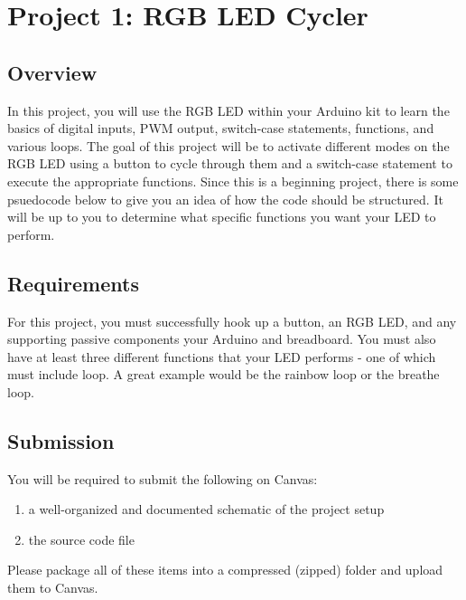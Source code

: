 %

\chapter{Project 1: RGB LED Cycler}

\section*{Overview}
In this project, you will use the RGB LED within your Arduino kit to learn the basics of digital inputs, PWM output, switch-case statements, functions, and various loops.
The goal of this project will be to activate different modes on the RGB LED using a button to cycle through them and a switch-case statement to execute the appropriate functions.
Since this is a beginning project, there is some psuedocode below to give you an idea of how the code should be structured.
It will be up to you to determine what specific functions you want your LED to perform.

\section*{Requirements}
For this project, you must successfully hook up a button, an RGB LED, and any supporting passive components your Arduino and breadboard.
You must also have at least three different functions that your LED performs - one of which must include loop. A great example would be the rainbow loop or the breathe loop.

\section*{Submission}
You will be required to submit the following on Canvas:
\begin{enumerate}
    \item a well-organized and documented schematic of the project setup
    \item the source code file
\end{enumerate}
Please package all of these items into a compressed (zipped) folder and upload them to Canvas.

